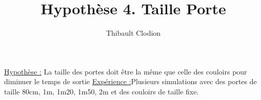 \documentclass[12pt]{article}
\title{Hypothèse 4. Taille Porte}
\author{Thibault Clodion}
\begin{document}
\maketitle %

\underline{Hypothèse :} La taille des portes doit être la même que celle des couloirs pour diminuer le temps de sortie
\newline\newline
\underline{Expérience :}Plusieurs simulations avec des portes de taille 80cm, 1m, 1m20, 1m50, 2m et des couloirs de taille fixe.
\newline\newline
\end{document}
